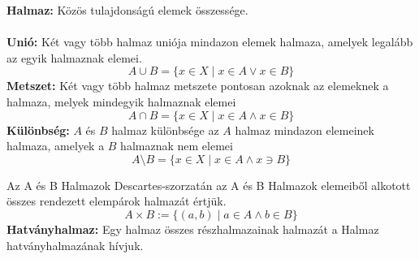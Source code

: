 \documentclass[12pt,a4paper]{article}
\begin{document}
\begin{tcolorbox}[colback=green!5!white,colframe=green!60!black,title= 1. Halmaz{,} unió{,} metszet{,} különbség]
    \textbf{Halmaz:} Közös tulajdonságú elemek összessége.\\\\
    \textbf{Unió:} Két vagy több halmaz uniója mindazon elemek halmaza, amelyek legalább az egyik halmaznak elemei.
                $$A \cup  B = \{ x \in X\mid x \in A \vee  x \in B\}$$
    \textbf{Metszet:} Két vagy több halmaz metszete pontosan azoknak az elemeknek a halmaza, melyek mindegyik halmaznak elemei
                $$A \cap   B = \{ x \in X\mid x \in A \wedge x \in B\}$$
    \textbf{Különbség:} \(A\) és \(B\) halmaz különbsége az \(A\) halmaz mindazon elemeinek halmaza, amelyek a \(B\) halmaznak nem elemei
                $$A \setminus   B = \{ x \in X\mid x \in A \wedge x \ni B\}$$
    \begin{center}
    \end{center}
\end{tcolorbox}

\begin{tcolorbox}[colback=green!5!white,colframe=green!60!black,title= 2. Descartes-szorzat{,} hatványhalmaz]
    Az A és B Halmazok Descartes-szorzatán az A és B Halmazok elemeiből alkotott összes rendezett elempárok halmazát értjük.
    $$A \times B := \{(a,b)\mid a \in A \wedge b \in B\}$$
    \textbf{Hatványhalmaz:} Egy halmaz összes részhalmazainak halmazát a Halmaz hatványhalmazának hívjuk.
\end{tcolorbox}
\end{document}
